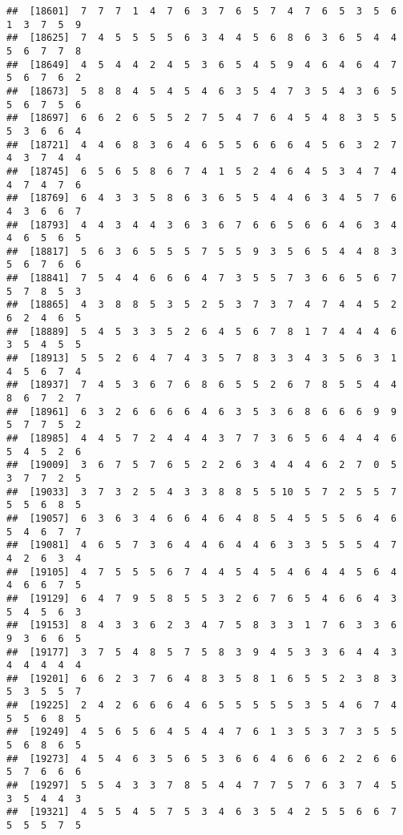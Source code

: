 \documentclass[
]{book}
\begin{document}
\begin{verbatim}
##  [18601]  7  7  7  1  4  7  6  3  7  6  5  7  4  7  6  5  3  5  6  1  3  7  5  9
##  [18625]  7  4  5  5  5  5  6  3  4  4  5  6  8  6  3  6  5  4  4  5  6  7  7  8
##  [18649]  4  5  4  4  2  4  5  3  6  5  4  5  9  4  6  4  6  4  7  5  6  7  6  2
##  [18673]  5  8  8  4  5  4  5  4  6  3  5  4  7  3  5  4  3  6  5  5  6  7  5  6
##  [18697]  6  6  2  6  5  5  2  7  5  4  7  6  4  5  4  8  3  5  5  5  3  6  6  4
##  [18721]  4  4  6  8  3  6  4  6  5  5  6  6  6  4  5  6  3  2  7  4  3  7  4  4
##  [18745]  6  5  6  5  8  6  7  4  1  5  2  4  6  4  5  3  4  7  4  4  7  4  7  6
##  [18769]  6  4  3  3  5  8  6  3  6  5  5  4  4  6  3  4  5  7  6  4  3  6  6  7
##  [18793]  4  4  3  4  4  3  6  3  6  7  6  6  5  6  6  4  6  3  4  4  6  5  6  5
##  [18817]  5  6  3  6  5  5  5  7  5  5  9  3  5  6  5  4  4  8  3  5  6  7  6  6
##  [18841]  7  5  4  4  6  6  6  4  7  3  5  5  7  3  6  6  5  6  7  5  7  8  5  3
##  [18865]  4  3  8  8  5  3  5  2  5  3  7  3  7  4  7  4  4  5  2  6  2  4  6  5
##  [18889]  5  4  5  3  3  5  2  6  4  5  6  7  8  1  7  4  4  4  6  3  5  4  5  5
##  [18913]  5  5  2  6  4  7  4  3  5  7  8  3  3  4  3  5  6  3  1  4  5  6  7  4
##  [18937]  7  4  5  3  6  7  6  8  6  5  5  2  6  7  8  5  5  4  4  8  6  7  2  7
##  [18961]  6  3  2  6  6  6  6  4  6  3  5  3  6  8  6  6  6  9  9  5  7  7  5  2
##  [18985]  4  4  5  7  2  4  4  4  3  7  7  3  6  5  6  4  4  4  6  5  4  5  2  6
##  [19009]  3  6  7  5  7  6  5  2  2  6  3  4  4  4  6  2  7  0  5  3  7  7  2  5
##  [19033]  3  7  3  2  5  4  3  3  8  8  5  5 10  5  7  2  5  5  7  5  5  6  8  5
##  [19057]  6  3  6  3  4  6  6  4  6  4  8  5  4  5  5  5  6  4  6  5  4  6  7  7
##  [19081]  4  6  5  7  3  6  4  4  6  4  4  6  3  3  5  5  5  4  7  4  2  6  3  4
##  [19105]  4  7  5  5  5  6  7  4  4  5  4  5  4  6  4  4  5  6  4  4  6  6  7  5
##  [19129]  6  4  7  9  5  8  5  5  3  2  6  7  6  5  4  6  6  4  3  5  4  5  6  3
##  [19153]  8  4  3  3  6  2  3  4  7  5  8  3  3  1  7  6  3  3  6  9  3  6  6  5
##  [19177]  3  7  5  4  8  5  7  5  8  3  9  4  5  3  3  6  4  4  3  4  4  4  4  4
##  [19201]  6  6  2  3  7  6  4  8  3  5  8  1  6  5  5  2  3  8  3  5  3  5  5  7
##  [19225]  2  4  2  6  6  6  4  6  5  5  5  5  5  3  5  4  6  7  4  5  5  6  8  5
##  [19249]  4  5  6  5  6  4  5  4  4  7  6  1  3  5  3  7  3  5  5  5  6  8  6  5
##  [19273]  4  5  4  6  3  5  6  5  3  6  6  4  6  6  6  2  2  6  6  5  7  6  6  6
##  [19297]  5  5  4  3  3  7  8  5  4  4  7  7  5  7  6  3  7  4  5  3  5  4  4  3
##  [19321]  4  5  5  4  5  7  5  3  4  6  3  5  4  2  5  5  6  6  7  5  5  5  7  5

\end{verbatim}
\end{document}
